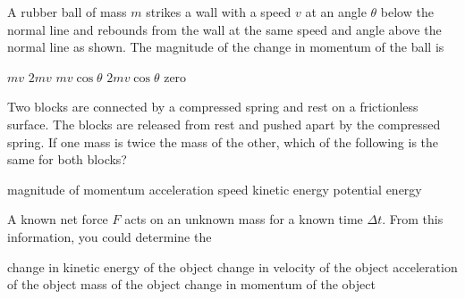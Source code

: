 \documentclass{../../oss-apphys-exam}
\begin{document}
\begin{multicols*}{2}
\begin{questions}
    \question A rubber ball of mass $m$ strikes a wall with a speed $v$ at
    an angle $\theta$ below the normal line and rebounds from the wall at the
    same speed and angle above the normal line as shown. The magnitude of the
    change in momentum of the ball is
    \begin{center}
    \end{center}
    \begin{choices}
      \choice $mv$
      \choice $2mv$
      \choice $mv\cos\theta$
      \choice $2mv\cos\theta$
      \choice  zero
    \end{choices}
    
    \question Two blocks are connected by a compressed spring and rest on a
    frictionless surface. The blocks are released from rest and pushed apart
    by the compressed spring. If one mass is twice the mass of the other,
    which of the following is the same for both blocks?
    \begin{choices}
      \choice magnitude of momentum
      \choice acceleration
      \choice speed
      \choice kinetic energy
      \choice potential energy
    \end{choices}
    \vspace{.7in}
    
    \question A known net force $F$ acts on an unknown mass for a known time
    $\Delta t$. From this information, you could determine the
    \begin{choices}
      \choice change in kinetic energy of the object
      \choice change in velocity of the object
      \choice acceleration of the object
      \choice mass of the object
      \choice change in momentum of the object
    \end{choices}
    \columnbreak
    

\end{questions}
\end{multicols*}
\end{document}
